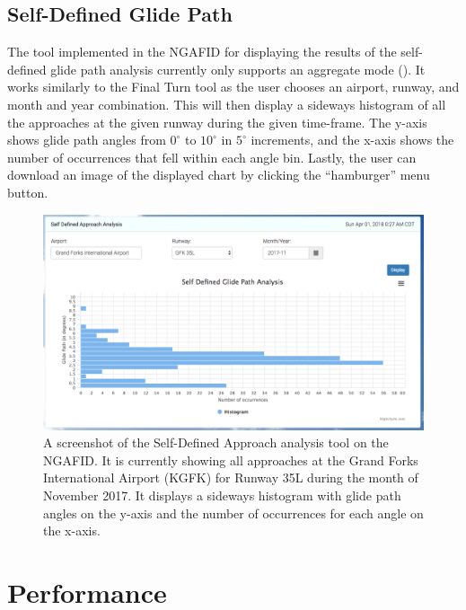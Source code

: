     \subsection{Self-Defined Glide Path}
    
    	The tool implemented in the NGAFID for displaying the results of the self-defined glide path analysis currently only supports an aggregate mode ().  It works similarly to the Final Turn tool as the user chooses an airport, runway, and month and year combination.  This will then display a sideways histogram of all the approaches at the given runway during the given time-frame.  The y-axis shows glide path angles from $0^\circ$ to $10^\circ$ in $5^\circ$ increments, and the x-axis shows the number of occurrences that fell within each angle bin.  Lastly, the user can download an image of the displayed chart by clicking the ``hamburger'' menu button.
    
    	\begin{figure}
    		\centering
            \includegraphics[width=\linewidth]{img/self_defined_screenshot}
            \caption{A screenshot of the Self-Defined Approach analysis tool on the NGAFID.  It is currently showing all approaches at the Grand Forks International Airport (KGFK) for Runway 35L during the month of November 2017.  It displays a sideways histogram with glide path angles on the y-axis and the number of occurrences for each angle on the x-axis.}
            \label{fig:self_defined_screenshot}
    	\end{figure}


\section{Performance}

